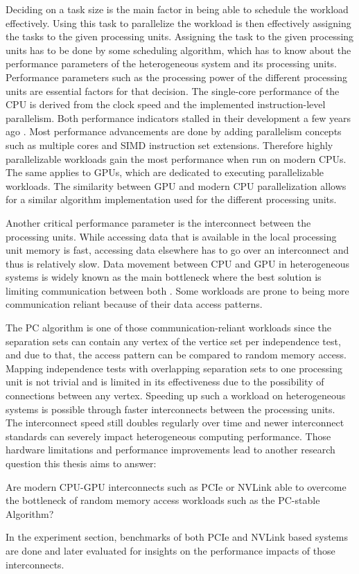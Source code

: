 Deciding on a task size is the main factor in being able to schedule the workload effectively. Using this task to parallelize the workload is then effectively assigning the tasks to the given processing units. Assigning the task to the given processing units has to be done by some scheduling algorithm, which has to know about the performance parameters of the heterogeneous system and its processing units.
Performance parameters such as the processing power of the different processing units are essential factors for that decision. The single-core performance of the CPU is derived from the clock speed and the implemented instruction-level parallelism. Both performance indicators stalled in their development a few years ago \cite{sutterFreeLunchFundamental2013}. Most performance advancements are done by adding parallelism concepts such as multiple cores and SIMD instruction set extensions. Therefore highly parallelizable workloads gain the most performance when run on modern CPUs. The same applies to GPUs, which are dedicated to executing parallelizable workloads.
The similarity between GPU and modern CPU parallelization allows for a similar algorithm implementation used for the different processing units.

Another critical performance parameter is the interconnect between the processing units. While accessing data that is available in the local processing unit memory is fast, accessing data elsewhere has to go over an interconnect and thus is relatively slow. Data movement between CPU and GPU in heterogeneous systems is widely known as the main bottleneck where the best solution is limiting communication between both \cite{hazarikaSurveyMemoryManagement2019}. Some workloads are prone to being more communication reliant because of their data access patterns.

The PC algorithm is one of those communication-reliant workloads since the separation sets can contain any vertex of the vertice set per independence test, and due to that, the access pattern can be compared to random memory access. Mapping independence tests with overlapping separation sets to one processing unit is not trivial and is limited in its effectiveness due to the possibility of connections between any vertex. Speeding up such a workload on heterogeneous systems is possible through faster interconnects between the processing units. The interconnect speed still doubles regularly over time \cite{NVLink2021} and newer interconnect standards can severely impact heterogeneous computing performance.
Those hardware limitations and performance improvements lead to another research question this thesis aims to answer:

Are modern CPU-GPU interconnects such as PCIe or NVLink able to overcome the bottleneck of random memory access workloads such as the PC-stable Algorithm?

In the experiment section, benchmarks of both PCIe and NVLink based systems are done and later evaluated for insights on the performance impacts of those interconnects.

